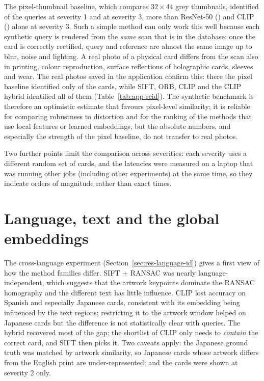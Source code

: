 The pixel-thumbnail baseline, which compares $32\times44$ grey thumbnails, identified  of the queries at severity 1 and  at severity 3, more than ResNet-50 () and CLIP () alone at severity 3. Such a simple method can only work this well because each synthetic query is rendered from the \emph{same} scan that is in the database: once the card is correctly rectified, query and reference are almost the same image up to blur, noise and lighting. A real photo of a physical card differs from the scan also in printing, colour reproduction, surface reflections of holographic cards, sleeves and wear. The real photos saved in the application confirm this: there the pixel baseline identified only  of the  cards, while SIFT, ORB, CLIP and the CLIP hybrid identified all of them (Table~\ref{tab:app-reid}). The synthetic benchmark is therefore an optimistic estimate that favours pixel-level similarity; it is reliable for comparing robustness to distortion and for the ranking of the methods that use local features or learned embeddings, but the absolute numbers, and especially the strength of the pixel baseline, do not transfer to real photos.

Two further points limit the comparison across severities: each severity uses a different random set of  cards, and the latencies were measured on a laptop that was running other jobs (including other experiments) at the same time, so they indicate orders of magnitude rather than exact times.

\section{Language, text and the global embeddings}

The cross-language experiment (Section~\ref{sec:res-language-id}) gives a first view of how the method families differ. SIFT + RANSAC was nearly language-independent, which suggests that the artwork keypoints dominate the RANSAC homography and the different text has little influence. CLIP lost accuracy on Spanish and especially Japanese cards, consistent with its embedding being influenced by the text regions; restricting it to the artwork window helped on Japanese cards but the difference is not statistically clear with  queries. The hybrid recovered most of the gap: the shortlist of CLIP only needs to \emph{contain} the correct card, and SIFT then picks it. Two caveats apply: the Japanese ground truth was matched by artwork similarity, so Japanese cards whose artwork differs from the English print are under-represented; and the cards were shown at severity 2 only.

